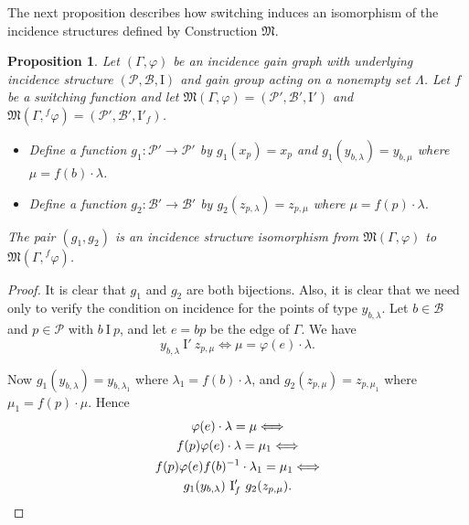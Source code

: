 \documentclass[11pt]{article}
\newtheorem{proposition}[theorem]{Proposition}
\theoremstyle{definition}
\begin{document}
The next proposition describes how switching induces an isomorphism of the incidence structures defined by Construction $\mathfrak{M}$.

\begin{proposition}
Let $(\Gamma,\varphi)$ be an incidence gain graph with underlying incidence structure $(\mathscr{P},\mathscr{B},\mathrm{I})$ and gain group acting on a nonempty set $\Lambda$.  Let $f$ be a switching function and let $\mathfrak{M}(\Gamma,\varphi) = (\mathscr{P}',\mathscr{B}', \mathrm{I}')$ and $\mathfrak{M}(\Gamma,{}^f\varphi) = (\mathscr{P}',\mathscr{B}',\mathrm{I}'_f)$.  

\begin{itemize}
\item Define a function $g_1: \mathscr{P}' \rightarrow \mathscr{P}'$ by $g_1(x_p) = x_p$ and $g_1(y_{b,\lambda}) = y_{b,\mu}$ where $\mu = f(b) \cdot \lambda$.
\item Define a function $g_2: \mathscr{B}' \rightarrow \mathscr{B}'$ by $g_2(z_{p,\lambda}) = z_{p,\mu}$ where $\mu = f(p) \cdot \lambda$.
\end{itemize}

The pair $(g_1,g_2)$ is an incidence structure isomorphism from $\mathfrak{M}(\Gamma,\varphi)$ to $\mathfrak{M}(\Gamma,{}^f\varphi)$.
\end{proposition}

\begin{proof}
It is clear that $g_1$ and $g_2$ are both bijections.  Also, it is clear that we need only to verify the condition on incidence for the points of type $y_{b, \lambda}$.  Let $b \in \mathscr{B}$ and $p \in \mathscr{P}$ with $b \  \mathrm{I} \  p$, and let $e = bp$ be the edge of $\Gamma$.  We have
$$y_{b, \lambda} \  \mathrm{I}' \  z_{p,\mu} \Longleftrightarrow \mu = \varphi(e) \cdot \lambda.$$

Now $g_1(y_{b, \lambda}) = y_{b,\lambda_1}$ where $\lambda_1 = f(b) \cdot \lambda$, and $g_2(z_{p, \mu}) = z_{p,\mu_1}$ where $\mu_1 = f(p) \cdot \mu$.  Hence
\begin{gather*}
\varphi(e) \cdot \lambda = \mu \Longleftrightarrow \\
f(p)\varphi(e) \cdot \lambda = \mu_1 \Longleftrightarrow \\ 
f(p)\varphi(e) f(b)^{-1} \cdot \lambda_1 = \mu_1 \Longleftrightarrow \\ 
g_1(y_{b, \lambda}) \  \mathrm{I}'_f \  g_2(z_{p, \mu}).
\qedhere
\end{gather*}
\end{proof}
\end{document}
